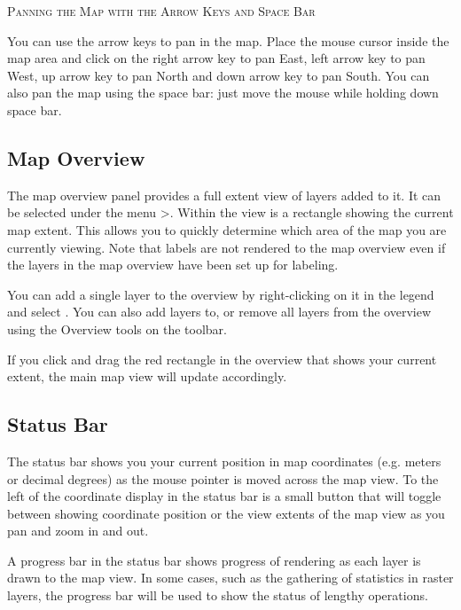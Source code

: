 \begin{Tip}\caption{\textsc{Panning the Map with the Arrow Keys and Space
Bar}}
You can use the arrow keys to pan in the map. Place the mouse cursor 
inside the map area and click on the right arrow key to pan East, left arrow 
key to pan West, up arrow key to pan North and down arrow key to pan South. 
You can also pan the map using the space bar: just move the mouse while
holding down space bar.
\end{Tip}

\subsection{Map Overview}\label{label_mapoverview}

The map overview panel provides a full extent view of layers added to it. It
can be selected under the menu  >.
Within the view is a rectangle showing the current map extent. This allows
you to quickly determine which area of the map you are currently viewing. Note
that labels are not rendered to the map overview even if the layers in the
map overview have been set up for labeling. 

You can add a single layer to the overview by right-clicking on it in the
legend and select . You can also add layers to,
or remove all layers from the overview using the Overview tools on the toolbar.

If you click and drag the red rectangle in the overview that shows your 
current extent, the main map view will update accordingly.

\subsection{Status Bar}\label{label_statusbar}

The status bar shows you your current position in map coordinates (e.g.
meters or decimal degrees) as the mouse pointer is moved across the map view.
To the left of the coordinate display in the status bar is a small button that 
will toggle between showing coordinate position or the view extents of the 
map view as you pan and zoom in and out. 

A progress bar in the status bar shows progress of rendering
as each layer is drawn to the map view. In some cases, such as the gathering
of statistics in raster layers, the progress bar will be used to show the
status of lengthy operations. 

